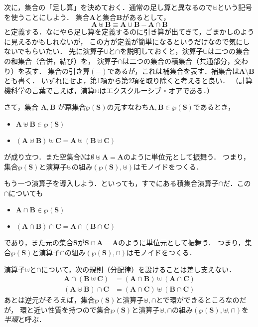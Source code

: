 \documentclass{jsbook}
\newcommand{\keyword}[1]{\emph{#1}}
\newcommand{\bg}[1]{\mathbf{#1}}
\begin{document}
次に，集合の「足し算」を決めておく．通常の足し算と異なるので$\uplus$という記号を使うことにしよう．
集合$\bg{A}$と集合$\bg{B}$があるとして，
\begin{equation}
\bg{A}\uplus\bg{B}\equiv\bg{A}\cup\bg{B}-\bg{A}\cap\bg{B}
\end{equation}
と定義する．なにやら足し算を定義するのに引き算が出てきて，ごまかしのように見えるかもしれないが，
この方が定義が簡単になるというだけなので気にしないでもらいたい．
先に演算子$\cup$と$\cap$を説明しておくと，演算子$\cup$は二つの集合の和集合（合併，結び）を，
演算子$\cap$は二つの集合の積集合（共通部分，交わり）を表す．
集合の引き算$(-)$であるが，これは補集合を表す．補集合は$\bg{A}\setminus\bg{B}$とも書く．
いずれにせよ，第1項から第2項を取り除くと考えると良い．
（計算機科学の言葉で言えば，演算$\uplus$はエクスクルーシブ・オアである．）

さて，集合 $\bg{A},\bg{B}$ が冪集合$\wp(\bg{S})$の元すなわち$\bg{A},\bg{B}\in\wp(\bg{S})$であるとき，
\begin{itemize}
\item $\bg{A}\uplus\bg{B}\in\wp(\bg{S})$
\item $(\bg{A}\uplus\bg{B})\uplus\bg{C}=\bg{A}\uplus(\bg{B}\uplus\bg{C})$
\end{itemize}
が成り立つ．また空集合$\emptyset$は$\emptyset\uplus\bg{A}=\bg{A}$のように単位元として振舞う．
つまり，集合$\wp(\bg{S})$と演算子$\uplus$の組み$(\wp(\bg{S}),\uplus)$はモノイドをつくる．

もう一つ演算子を導入しよう．といっても，すでにある積集合演算子$\cap$だ．この$\cap$についても
\begin{itemize}
\item $\bg{A}\cap\bg{B}\in\wp(\bg{S})$
\item $(\bg{A}\cap\bg{B})\cap\bg{C}=\bg{A}\cap(\bg{B}\cap\bg{C})$
\end{itemize}
であり，また元の集合$\bg{S}$が$\bg{S}\cap\bg{A}=\bg{A}$のように単位元として振舞う．
つまり，集合$\wp(\bg{S})$と演算子$\cap$の組み$(\wp(\bg{S}),\cap)$はモノイドをつくる．

演算子$\uplus$と$\cap$について，次の規則（分配律）を設けることは差し支えない．
\begin{align}
\bg{A}\cap(\bg{B}\uplus\bg{C})&=(\bg{A}\cap\bg{B})\uplus(\bg{A}\cap\bg{C})\\
(\bg{A}\uplus\bg{B})\cap\bg{C}&=(\bg{A}\cap\bg{C})\uplus(\bg{B}\cap\bg{C})
\end{align}
あとは逆元がそろえば，集合$\wp(\bg{S})$と演算子$\uplus,\cap$とで環ができるところなのだが，
環と近い性質を持つので集合$\wp(\bg{S})$と演算子$\uplus,\cap$の組み$(\wp(\bg{S}),\uplus,\cap)$を\keyword{半環}と呼ぶ．
\end{document}
